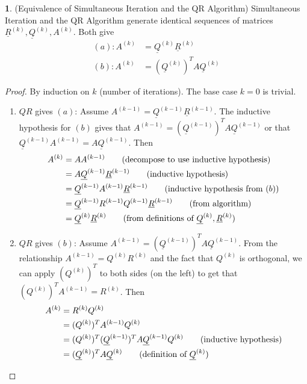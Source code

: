 \documentclass[12pt]{article}
\theoremstyle{definition}
\newtheorem{theorem}{\color{ForestGreen}{\textbf{Theorem}}}
\theoremstyle{definition}
\begin{document}
\begin{theorem}(Equivalence of Simultaneous Iteration and the QR Algorithm)
Simultaneous Iteration and the QR Algorithm generate identical sequences of matrices $\underline R^{(k)}, \underline Q^{(k)}, A^{(k)}$. Both give
\begin{align}
	(a): A^{(k)} &= \underline Q^{(k)} \underline R^{(k)} \tag{$QR$ factorization of the $k$th power of $A$}\\
	(b): A^{(k)} &= (\underline Q^{(k)})^T A \underline Q^{(k)} \tag{projection}
\end{align}
\end{theorem}
\begin{proof}
By induction on $k$ (number of iterations). The base case $k=0$ is trivial. 
\begin{enumerate}
	\item $QR$ gives $(a)$: Assume $A^{(k-1)} = \underline Q^{(k-1)} \underline R^{(k-1)}$. The inductive hypothesis for $(b)$ gives that $A^{(k-1)} = (\underline Q^{(k-1)})^T A \underline Q^{(k-1)}$ or that $ \underline Q^{(k-1)} A^{(k-1)} = A \underline Q^{(k-1)}$. Then
	\begin{align*}
		A^{(k)} &= A A^{(k-1)} \tag{decompose to use inductive hypothesis}\\
		&= A \underline Q^{(k-1)} \underline R^{(k-1)} \tag{inductive hypothesis}\\
		&= \underline Q^{(k-1)} A^{(k-1)} \underline R^{(k-1)} \tag{inductive hypothesis from $(b)$}\\
		&= \underline Q^{(k-1)} R^{(k-1)}Q^{(k-1)} \underline R^{(k-1)} \tag{from algorithm} \\
		&= \underline Q^{(k)} \underline R^{(k)} \tag{from definitions of $\underline Q^{(k)}, \underline R^{(k)}$}
	\end{align*}
	\item $QR$ gives $(b)$: Assume $A^{(k-1)} = (\underline Q^{(k-1)})^T A \underline Q^{(k-1)}$. From the relationship $A^{(k-1)} = Q^{(k)}R^{(k)}$ and the fact that $Q^{(k)}$ is orthogonal, we can apply $(Q^{(k)})^T$ to both sides (on the left) to get that $(Q^{(k)})^T A^{(k-1)} = R^{(k)}$. Then
	\begin{align*}
		A^{(k)} &= R^{(k)}Q^{(k)} \\
		&= (Q^{(k)})^T A^{(k-1)} Q^{(k)} \\
		&= (Q^{(k)})^T (\underline Q^{(k-1)})^T A \underline Q^{(k-1)} Q^{(k)} \tag{inductive hypothesis} \\
		&= (\underline Q^{(k)})^T A \underline Q^{(k)} \tag{definition of $\underline Q^{(k)}$}
	\end{align*}
\end{enumerate}
\end{proof}
\end{document}
